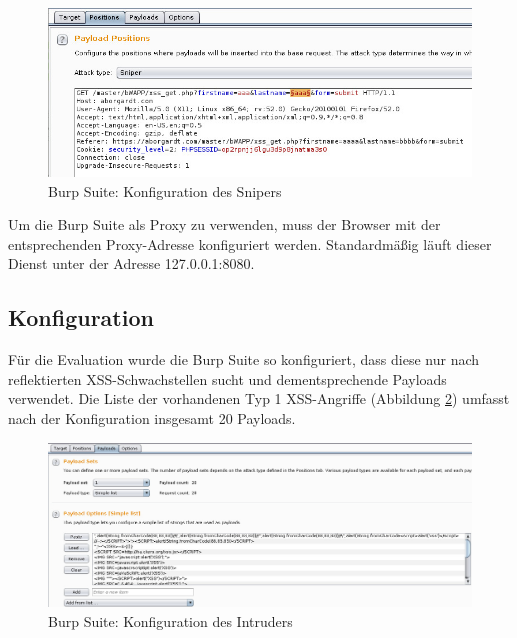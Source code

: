 \begin{figure}[htbp] 
	\centering
	\includegraphics[width=\textwidth]{contents/images/BurpSuitebWAPPSniperSettings}
	\caption{Burp Suite: Konfiguration des Snipers}
	\label{fig:BurpSuitebWAPPSniperSettings}
\end{figure}

Um die Burp Suite als Proxy zu verwenden, muss der Browser mit der entsprechenden Proxy-Adresse konfiguriert werden. Standardmäßig läuft dieser Dienst unter der Adresse 127.0.0.1:8080.

\FloatBarrier
\subsection{Konfiguration}

Für die Evaluation wurde die Burp Suite so konfiguriert, dass diese nur nach reflektierten XSS-Schwachstellen sucht und dementsprechende Payloads verwendet. Die Liste der vorhandenen Typ 1 XSS-Angriffe (Abbildung \ref{fig:BurpSuitebWAPPIntruderSettings}) umfasst nach der Konfiguration insgesamt 20 Payloads.

\begin{figure}[htbp] 
	\centering
	\includegraphics[width=\textwidth]{contents/images/BurpSuitebWAPPIntruderSettings}
	\caption{Burp Suite: Konfiguration des Intruders}
	\label{fig:BurpSuitebWAPPIntruderSettings}
\end{figure}

\newpage

